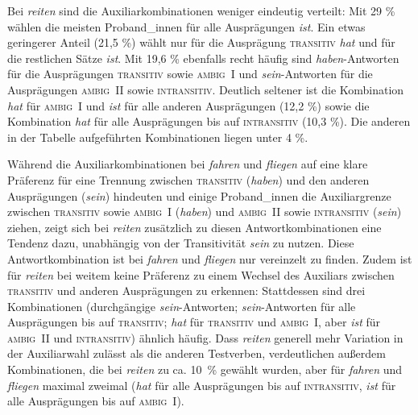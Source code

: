 
Bei \textit{reiten} sind die Auxiliarkombinationen weniger eindeutig verteilt: Mit 29 \% wählen die meisten Proband\_innen für alle Ausprägungen \textit{ist}. Ein etwas geringerer Anteil (21,5 \%) wählt nur für die Ausprägung \textsc{transitiv} \textit{hat} und für die restlichen Sätze \textit{ist}. Mit 19,6 \% ebenfalls recht häufig sind \textit{haben}-Antworten für die Ausprägungen \textsc{transitiv} sowie \textsc{ambig~I} und \textit{sein}-Antworten für die Ausprägungen \textsc{ambig~II} sowie \textsc{intransitiv}. Deutlich seltener ist die Kombination \textit{hat} für \textsc{ambig~I} und \textit{ist} für alle anderen Ausprägungen (12,2 \%) sowie die Kombination \textit{hat} für alle Ausprägungen bis auf \textsc{intransitiv} (10,3 \%). Die anderen in der Tabelle aufgeführten Kombinationen liegen unter 4 \%. 



Während die Auxiliarkombinationen bei \textit{fahren} und \textit{fliegen} auf eine klare Präferenz für eine Trennung zwischen \textsc{transitiv} (\textit{haben}) und den anderen Ausprägungen (\textit{sein}) hindeuten und einige Proband\_innen die Auxiliargrenze zwischen \textsc{transitiv} sowie \textsc{ambig~I} (\textit{haben}) und \textsc{ambig~II} sowie \textsc{intransitiv} (\textit{sein}) ziehen, zeigt sich bei \textit{reiten} zusätzlich zu diesen Antwortkombinationen eine Tendenz dazu, unabhängig von der Transitivität \textit{sein} zu nutzen. Diese Antwortkombination ist bei \textit{fahren} und \textit{fliegen} nur vereinzelt zu finden. Zudem ist für \textit{reiten} bei weitem keine Präferenz zu einem Wechsel des Auxiliars zwischen \textsc{transitiv} und anderen Ausprägungen zu erkennen: Stattdessen sind drei Kombinationen (durchgängige \textit{sein}-Antworten; \textit{sein}-Antworten für alle Ausprägungen bis auf \textsc{transitiv}; \textit{hat} für \textsc{transitiv} und \textsc{ambig~I}, aber \textit{ist} für \textsc{ambig~II} und \textsc{intransitiv}) ähnlich häufig. Dass \textit{reiten} generell mehr Variation in der Auxiliarwahl zulässt als die anderen Testverben, verdeutlichen außerdem Kombinationen, die bei \textit{reiten} zu ca. 10~\% gewählt wurden, aber für \textit{fahren} und \textit{fliegen} maximal zweimal (\textit{hat} für alle Ausprägungen bis auf \textsc{intransitiv}, \textit{ist} für alle Ausprägungen bis auf \textsc{ambig~I}).  

